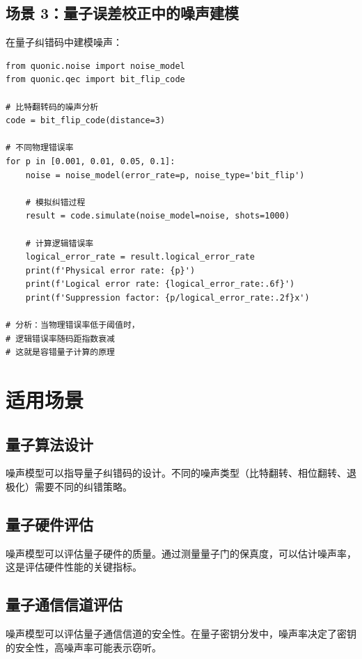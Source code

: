 \documentclass[12pt,a4paper]{article}
\begin{document}
\subsection{场景 3：量子误差校正中的噪声建模}

在量子纠错码中建模噪声：

\begin{verbatim}
from quonic.noise import noise_model
from quonic.qec import bit_flip_code

# 比特翻转码的噪声分析
code = bit_flip_code(distance=3)

# 不同物理错误率
for p in [0.001, 0.01, 0.05, 0.1]:
    noise = noise_model(error_rate=p, noise_type='bit_flip')

    # 模拟纠错过程
    result = code.simulate(noise_model=noise, shots=1000)

    # 计算逻辑错误率
    logical_error_rate = result.logical_error_rate
    print(f'Physical error rate: {p}')
    print(f'Logical error rate: {logical_error_rate:.6f}')
    print(f'Suppression factor: {p/logical_error_rate:.2f}x')

# 分析：当物理错误率低于阈值时，
# 逻辑错误率随码距指数衰减
# 这就是容错量子计算的原理
\end{verbatim}

\section{适用场景}

\subsection{量子算法设计}

噪声模型可以指导量子纠错码的设计。不同的噪声类型（比特翻转、相位翻转、退极化）需要不同的纠错策略。

\subsection{量子硬件评估}

噪声模型可以评估量子硬件的质量。通过测量量子门的保真度，可以估计噪声率，这是评估硬件性能的关键指标。

\subsection{量子通信信道评估}

噪声模型可以评估量子通信信道的安全性。在量子密钥分发中，噪声率决定了密钥的安全性，高噪声率可能表示窃听。
\end{document}
